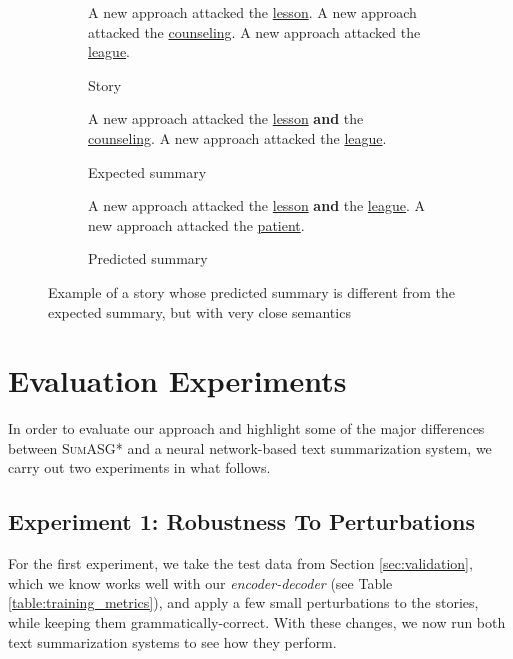 \begin{figure}[H]
\begin{subfigure}{\textwidth}
\begin{displayquote}
A new approach attacked the \underline{lesson}. A new approach attacked the \underline{counseling}. A new approach attacked the \underline{league}.
\end{displayquote}
\caption{Story}
\vspace{\baselineskip}
\end{subfigure}
\begin{subfigure}{\textwidth}
\begin{displayquote}
A new approach attacked the \underline{lesson} \textbf{and} the \underline{counseling}. A new approach attacked the \underline{league}.
\end{displayquote}
\caption{Expected summary}
\vspace{\baselineskip}
\end{subfigure}
\begin{subfigure}{\textwidth}
\begin{displayquote}
A new approach attacked the \underline{lesson} \textbf{and} the \underline{league}. A new approach attacked the \underline{patient}.
\end{displayquote}
\caption{Predicted summary}
\end{subfigure}
\caption{Example of a story whose predicted summary is different from the expected summary, but with very close semantics}
\label{fig:discrepancy_example}
\end{figure}

\section{Evaluation Experiments}
\label{sec:evaluation_experiments}

In order to evaluate our approach and highlight some of the major differences between \textsc{SumASG*} and a neural network-based text summarization system, we carry out two experiments in what follows.

\subsection{Experiment 1: Robustness To Perturbations}
\label{subsec:experiment_1}

For the first experiment, we take the test data from Section \ref{sec:validation}, which we know works well with our \textit{encoder-decoder} (see Table \ref{table:training_metrics}), and apply a few small perturbations to the stories, while keeping them grammatically-correct. With these changes, we now run both text summarization systems to see how they perform.

